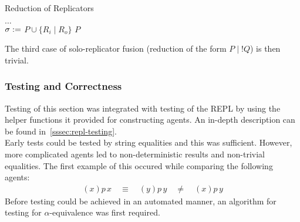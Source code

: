         \begin{breakablealgorithm}
            \caption{Reduction of Replicators}
            \begin{algorithmic}[1]
                        \State$\ldots$
                    \EndFor\\

                                \State$\sigma :=$ 
                                    \State\Return$P \cup \{R_i \; | \; R_o\}$
                                \EndIf
                            \EndIf
                        \EndFor
                    \EndFor
                    \State\Return$P$
                \EndFunction
            \end{algorithmic}
        \end{breakablealgorithm}

        The third case of solo-replicator fusion (reduction of the form $P \;|\; !Q$) is then trivial.


    \subsubsection{Testing and Correctness}
        Testing of this section was integrated with testing of the REPL by using the helper functions it provided for constructing agents.
        An in-depth description can be found in~\ref{sssec:repl-testing}. \\
        
        Early tests could be tested by string equalities and this was sufficient.
        However, more complicated agents led to non-deterministic results and non-trivial equalities.
        The first example of this occured while comparing the following agents:
        \begin{align*}
            (x) p \, x \quad\equiv\quad (y) p \, y \quad\neq\quad (x) p \, y
        \end{align*}
        Before testing could be achieved in an automated manner, an algorithm for testing for $\alpha$-equivalence was first required.\\

